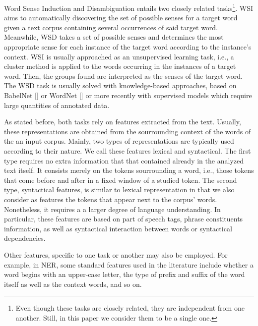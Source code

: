 \documentclass[11pt]{article}
\begin{document}

Word Sense Induction and Disambiguation entails two closely related tasks\footnote{Even though these tasks are closely related, they are independent from one another. Still, in this paper we consider them to be a single one.}. WSI aims to automatically discovering the set of possible senses for a target word given a text corpus containing several occurrences of said target word. Meanwhile, WSD takes a set of possible senses and determines the most appropriate sense for each instance of the target word according to the instance's context. WSI is usually approached as an unsupervised learning task, i.e., a cluster method is applied to the words occurring in the instances of a target word. Then, the groups found are interpreted as the senses of the target word. The WSD task is usually solved with knowledge-based approaches, based on BabelNet [] or WordNet [] or more recently with supervised models which require large quantities of annotated data.

As stated before, both tasks rely on features extracted from the text. Usually, these representations are obtained from the sourrounding context of the words of the an input corpus. Mainly,  two types of representations are typically used according to their nature. We call these features lexical and syntactical. 	The first type requires no extra information that that contained already in the analyzed text itself. It consists merely on the tokens sourrounding a word, i.e., those tokens that come before and after in a fixed window of a studied token. The second type, syntactical features, is similar to lexical representation in that we also consider as features the tokens that appear next to the corpus' words. Nonetheless, it requires a a larger degree of language understanding. In particular, these features are based on part of speech tags, phrase constituents information, as well as syntactical interaction between words or syntactical dependencies.

Other features, specific to one task or another may also be employed. For example, in NER, some standard features used in the literature include whether a word begins with an upper-case letter, the type of prefix and suffix of the word itself as well as the context words, and so on.
\end{document}
